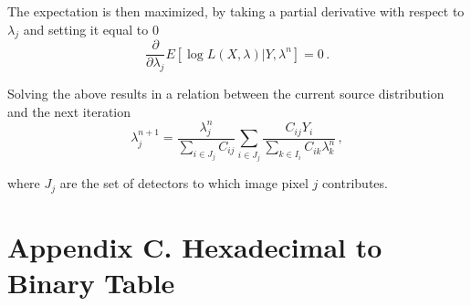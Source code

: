 \documentclass[10pt]{article}
\begin{document}
\noindent The expectation is then maximized, by taking a partial derivative with respect to $\lambda_j$ and setting it equal to 0
 \begin{equation} \tag{B.5}
	\frac{\partial}{\partial \lambda_j} E[\log L(X,\lambda) | Y,\lambda^n] = 0\,.
\end{equation}

\noindent Solving the above results in a relation between the current source distribution and the next iteration
%
 \begin{equation} \tag{B.6}
	\lambda_j^{n+1} = \frac{\lambda_j^n}{\sum\limits_{i \in J_j}C_{ij}} \sum_{i \in J_j} \frac{C_{ij}Y_i}{\sum\limits_{k \in I_i}C_{ik}\lambda_k^n}\,,
\end{equation}

\noindent where $J_j$ are the set of detectors to which image pixel $j$ contributes.


\section*{Appendix C. Hexadecimal to Binary Table}


\vspace{-10pt}
\end{document}
